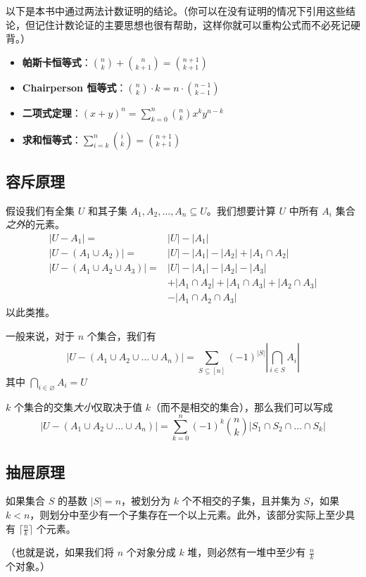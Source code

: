 以下是本书中通过两法计数证明的结论。（你可以在没有证明的情况下引用这些结论，但记住计数论证的主要思想也很有帮助，这样你就可以重构公式而不必死记硬背。）

\begin{itemize}
    \item \textbf{帕斯卡恒等式}：${n \choose k}+{n \choose k+1}={n+1 \choose k+1}$
    \item \textbf{Chairperson 恒等式}：${n \choose k}\cdot k = n \cdot {n-1 \choose k-1}$
    \item \textbf{二项式定理}：$(x+y)^n = \sum_{k=0}^n {n \choose k}x^ky^{n-k}$
    \item \textbf{求和恒等式}：$\sum_{i=k}^n {i \choose k}={n+1 \choose k+1}$
\end{itemize}

\subsection{容斥原理}

假设我们有全集 $U$ 和其子集 $A_1,A_2,\dots, A_n \subseteq U$。我们想要计算 $U$ 中所有 $A_i$ 集合\emph{之外}的元素。
\begin{align*}
    |U-A_1|=                     & |U|-|A_1|                                     \\
    |U-(A_1 \cup A_2) |=         & |U| - |A_1| - |A_2| + |A_1 \cap A_2|          \\
    |U-(A_1 \cup A_2 \cup A_3)|= & |U| - |A_1| - |A_2| - |A_3|                   \\
                                 & +|A_1 \cap A_2|+|A_1 \cap A_3|+|A_2 \cap A_3| \\
                                 & -|A_1 \cap A_2 \cap A_3|
\end{align*}
以此类推。

一般来说，对于 $n$ 个集合，我们有
\[|U-(A_1 \cup A_2 \cup \dots \cup A_n) |= \sum_{S \subseteq [n]}(-1)^{|S|} |\bigcap_{i \in S} A_i|\]
其中 $\bigcap_{i \in \varnothing} A_i = U$

$k$ 个集合的交集\emph{大小}仅取决于值 $k$（而不是相交的集合），那么我们可以写成
\[|U-(A_1 \cup A_2 \cup \dots \cup A_n)|= \sum_{k=0}^n (-1)^k {n \choose k} |S_1 \cap S_2 \cap \dots \cap S_k|\]

\subsection{抽屉原理}

如果集合 $S$ 的基数 $|S|= n$，被划分为 $k$ 个不相交的子集，且并集为 $S$，如果 $k < n$，则划分中至少有一个子集存在一个以上元素。此外，该部分实际上至少具有 $\lceil \frac{n}{k} \rceil$ 个元素。

（也就是说，如果我们将 $n$ 个对象分成 $k$ 堆，则必然有一堆中至少有 $\frac{n}{k}$ 个对象。）
